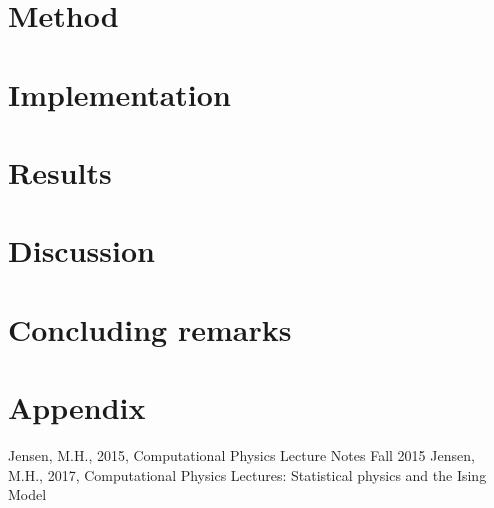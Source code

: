 \documentclass{article}
\begin{document}
\begin{multicols}{2}
\section{Method}


\section{Implementation}



\section{Results}


\section{Discussion}



\section{Concluding remarks}




\end{multicols}

\clearpage

\appendix %

\section{Appendix}



\begin{thebibliography}{9}
	Jensen, M.H., 2015, Computational Physics Lecture Notes Fall 2015
	Jensen, M.H., 2017, Computational Physics Lectures: Statistical physics and the Ising Model
\end{thebibliography}
\end{document}
